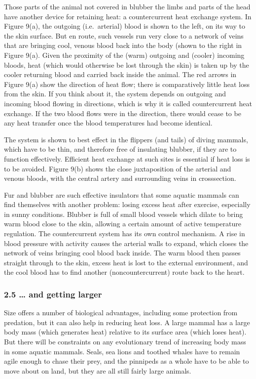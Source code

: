 \documentclass[letterpaper,10pt,english]{sphinxmanual}
\begin{document}
Those parts of the animal not covered in blubber \textendash{} the limbs and parts of the head \textendash{} have another device for retaining heat: a countercurrent heat exchange system. In Figure 9(a), the outgoing (i.e. arterial) blood is shown to the left, on its way to the skin surface. But en route, such vessels run very close to a network of veins that are bringing cool, venous blood back into the body (shown to the right in Figure 9(a). Given the proximity of the (warm) outgoing and (cooler) incoming bloods,
heat (which would otherwise be lost through the skin) is taken up by the cooler returning blood and carried back inside the animal. The red arrows in Figure 9(a) show the direction of heat flow; there is comparatively little heat loss from the skin. If you think about it, the system depends on outgoing and incoming blood flowing in  directions, which is why it is called countercurrent heat exchange. If the two blood flows were in the  direction, there would cease to be any heat
transfer once the blood temperatures had become identical.

The system is shown to best effect in the flippers (and tails) of diving mammals, which have to be thin, and therefore free of insulating blubber, if they are to function effectively. Efficient heat exchange at such sites is essential if heat loss is to be avoided. Figure 9(b) shows the close juxtaposition of the arterial and venous bloods, with the central artery and surrounding veins in cross\sphinxhyphen{}section.

Fur and blubber are such effective insulators that some aquatic mammals can find themselves with another problem: losing excess heat after exercise, especially in sunny conditions. Blubber is full of small blood vessels which dilate to bring warm blood close to the skin, allowing a certain amount of active temperature regulation. The countercurrent system has its own control mechanism. A rise in blood pressure with activity causes the arterial walls to expand, which closes the network of veins
bringing cool blood back inside. The warm blood then passes straight through to the skin, excess heat is lost to the external environment, and the cool blood has to find another (non\sphinxhyphen{}countercurrent) route back to the heart.


\subsubsection{2.5 … and getting larger}
\label{\detokenize{content/session_00/Part_00_02:2.5-_u2026-and-getting-larger}}
Size offers a number of biological advantages, including some protection from predation, but it can also help in reducing heat loss. A large mammal has a large body mass (which generates heat) relative to its surface area (which loses heat). But there will be constraints on any evolutionary trend of increasing body mass in some aquatic mammals. Seals, sea lions and toothed whales have to remain agile enough to chase their prey, and the pinnipeds as a whole have to be able to move about on land,
but they are all still fairly large animals.
\end{document}
